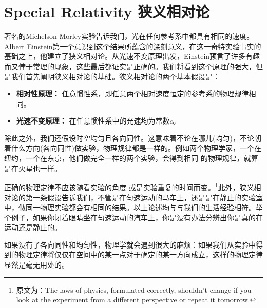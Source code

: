 



\chapter[狭义相对论]{Special Relativity \quad 狭义相对论}
\label{chap2}
 著名的Michelson-Morley实验告诉我们，光在任何参考系中都具有相同的速度。Albert Einstein第一个意识到这个结果所蕴含的深刻意义，在这一奇特实验事实的基础之上，他建立了狭义相对论。从光速不变原理出发，Einstein预言了许多有趣而又悖于常理的现象，这些最后都证实是正确的。我们将看到这个原理的强大，但是我们首先阐明狭义相对论的基础。狭义相对论的两个基本假设是：
 \begin{itemize}
   \item {\bf{相对性原理：}} 任意惯性系，即任意两个相对速度恒定的参考系的物理规律相同。
   \item {\bf{光速不变原理：}} 在任意惯性系中的光速均为常数$c$。
 \end{itemize}
除此之外，我们还假设时空均匀且各向同性。这意味着不论在哪儿(均匀)，不论朝着什么方向(各向同性)做实验，物理规律都是一样的。例如两个物理学家，一个在纽约，一个在东京，他们做完全一样的两个实验，会得到相同
  的物理规律，就算是在火星也一样。

正确的物理定律不应该随看实验的角度%
或是实验重复的时间而变。\footnote{原文为：The laws of physics, formulated correctly, shouldn't change if you look at the experiment from a different perspective or repeat it tomorrow.}此外，狭义相对论的第一条假设告诉我们，不管是在匀速运动的马车上，还是是在静止的实验室中，做同一物理实验都会有相同的结果。以上论述均与与我们的生活经验相符。举个例子，如果你闭着眼睛坐在匀速运动的汽车上，你是没有办法分辨出你是真的在运动还是静止的。

如果没有了各向同性和均匀性，物理学就会遇到很大的麻烦：如果我们从实验中得到的物理定律将仅仅在空间中的某一点对于确定的某一方向成立，这样的物理定律显然是毫无用处的。

